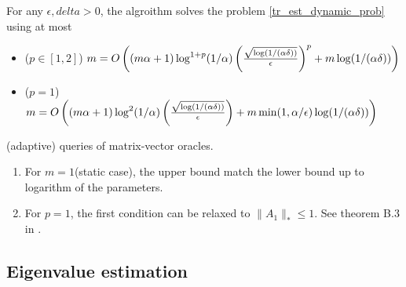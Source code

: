 

\begin{thm}
\label{tr_est_alg_schatten_p}
For any $\epsilon,delta>0$, the algroithm  solves the problem \ref{tr_est_dynamic_prob} using at most
\begin{itemize}
    \item ($p\in[1,2]$) $m=O\left((m\alpha +1)\log^{1+p}(1/\alpha)\left(\frac{\sqrt{\log(1/(\alpha\delta))}}{\epsilon}\right)^p+m\log(1/(\alpha\delta))\right)$
    \item ($p=1$) $m=O\left((m\alpha +1)\log^{2}(1/\alpha)\left(\frac{\sqrt{\log(1/(\alpha\delta))}}{\epsilon}\right)+m\min(1,\alpha/\epsilon)\log(1/(\alpha\delta))\right)$
\end{itemize}
(adaptive) queries of matrix-vector oracles.
\end{thm}
\pfsk{\ref{tr_est_alg_schatten_p}}{
}
\begin{rmk}
\begin{enumerate}
    \item For $m=1$(static case), the upper bound match the lower bound up to logarithm of the parameters.
    \item For $p=1$, the first condition can be relaxed to $\|A_1\|_*\le 1$. See theorem B.3 in \cite{woodruff2022optimal}.
\end{enumerate}
\end{rmk}

\subsection{Eigenvalue estimation}
\cite{braverman2021gradient}
